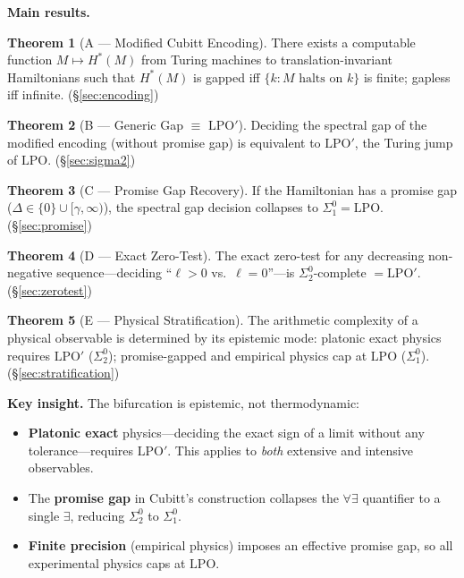 \documentclass[11pt,a4paper]{article}
\theoremstyle{plain}
\theoremstyle{definition}
\newtheorem*{theorem*}{Theorem}
\newcommand{\LPO}{\ensuremath{\mathrm{LPO}}}
\newcommand{\LPOj}{\ensuremath{\mathrm{LPO'}}}
\begin{document}
\medskip\noindent
\textbf{Main results.}

\begin{theorem*}[A --- Modified Cubitt Encoding]
There exists a computable function $M \mapsto H^*(M)$ from Turing
machines to translation-invariant Hamiltonians such that $H^*(M)$ is
gapped iff $\{k : M \text{ halts on } k\}$ is finite; gapless iff
infinite.  (\S\ref{sec:encoding})
\end{theorem*}

\begin{theorem*}[B --- Generic Gap $\equiv$ $\LPOj$]
Deciding the spectral gap of the modified encoding (without promise gap)
is equivalent to $\LPOj$, the Turing jump of $\LPO$.
(\S\ref{sec:sigma2})
\end{theorem*}

\begin{theorem*}[C --- Promise Gap Recovery]
If the Hamiltonian has a promise gap
($\Delta \in \{0\} \cup [\gamma, \infty)$), the spectral gap decision
collapses to $\Sigma_1^0 = \LPO$.  (\S\ref{sec:promise})
\end{theorem*}

\begin{theorem*}[D --- Exact Zero-Test]
The exact zero-test for any decreasing non-negative sequence---deciding
``$\ell > 0$ vs.\ $\ell = 0$''---is $\Sigma_2^0$-complete $= \LPOj$.
(\S\ref{sec:zerotest})
\end{theorem*}

\begin{theorem*}[E --- Physical Stratification]
The arithmetic complexity of a physical observable is determined by its
epistemic mode: platonic exact physics requires $\LPOj$ ($\Sigma_2^0$);
promise-gapped and empirical physics cap at $\LPO$ ($\Sigma_1^0$).
(\S\ref{sec:stratification})
\end{theorem*}

\medskip\noindent
\textbf{Key insight.}  The bifurcation is epistemic, not thermodynamic:
\begin{itemize}[nosep]
\item \textbf{Platonic exact} physics---deciding the exact sign of a
  limit without any tolerance---requires $\LPOj$.  This applies to
  \emph{both} extensive and intensive observables.
\item The \textbf{promise gap} in Cubitt's construction collapses the
  $\forall\exists$ quantifier to a single $\exists$, reducing
  $\Sigma_2^0$ to $\Sigma_1^0$.
\item \textbf{Finite precision} (empirical physics) imposes an effective
  promise gap, so all experimental physics caps at $\LPO$.
\end{itemize}
\end{document}
